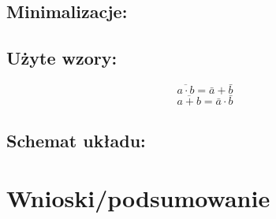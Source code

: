 \documentclass[12pt,a4paper]{article}
\begin{document}
			
	
		\subsection{Minimalizacje:}
			
		
		\subsection{Użyte wzory:}
			\begin{equation}
			\overline{a\cdot b}=\bar{a}+\bar{b}
			\end{equation}
			\begin{equation}
			\overline{a+b}=\bar{a}\cdot\bar{b}
			\end{equation}
			
		\subsection{Schemat układu:}
		
	

	\section{Wnioski/podsumowanie}
	
\end{document}
